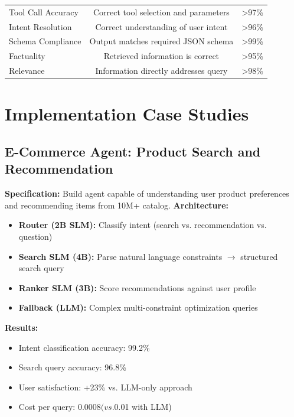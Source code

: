 \documentclass[11pt,a4paper]{article}
\begin{document}
\begin{itemize}
\begin{table}[h]
\begin{tabular}{lcc}
        Tool Call Accuracy & Correct tool selection and parameters & >97\% \\
        \addlinespace %
        Intent Resolution & Correct understanding of user intent & >96\% \\
        \addlinespace %
        Schema Compliance & Output matches required JSON schema & >99\% \\
        \addlinespace %
        Factuality & Retrieved information is correct & >95\% \\
        \addlinespace %
        Relevance & Information directly addresses query & >98\% \\
        \bottomrule %
    \end{tabular}
\end{table}
\end{itemize}
\section{Implementation Case Studies}

\subsection{E-Commerce Agent: Product Search and Recommendation}
\textbf{Specification: } Build agent capable of understanding user product preferences and recommending items from 10M+ catalog. \newline \newline  
\textbf{Architecture: }  \newline 
\begin{itemize}
    \item \textbf{Router (2B SLM):} Classify intent (search vs. recommendation vs. question)
    \item \textbf{Search SLM (4B):} Parse natural language constraints $\rightarrow$ structured search query
    \item \textbf{Ranker SLM (3B):} Score recommendations against user profile
    \item \textbf{Fallback (LLM):} Complex multi-constraint optimization queries
\end{itemize}
\textbf{Results: } 
\begin{itemize}
    \item Intent classification accuracy: 99.2\%
    \item Search query accuracy: 96.8\%
    \item User satisfaction: +23\% vs. LLM-only approach
    \item Cost per query: $0.0008 (vs. $0.01 with LLM)\cite{nvidia2025}
\end{itemize}
\end{document}
